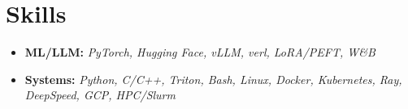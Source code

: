 \documentclass[10pt]{article}
\newcommand{\resumeItemTwo}[2]{\item\textbf{#1} \textit{\small #2}}
\newcommand{\resumeSubHeadingListStart}{\begin{itemize}[leftmargin=1.2em,topsep=0pt,partopsep=0pt,itemsep=1pt,parsep=0pt]}
\newcommand{\resumeSubHeadingListEnd}{\end{itemize}}
\begin{document}
\section{Skills}
\resumeSubHeadingListStart
    \resumeItemTwo{ML/LLM:}{PyTorch, Hugging Face, vLLM, verl, LoRA/PEFT, W\&B}
    \resumeItemTwo{Systems:}{Python, C/C++, Triton, Bash, Linux, Docker, Kubernetes, Ray, DeepSpeed, GCP, HPC/Slurm}
\resumeSubHeadingListEnd
\end{document}
